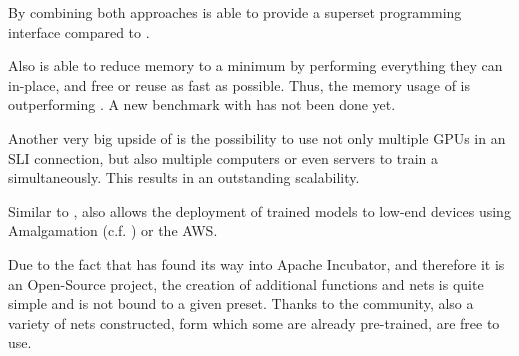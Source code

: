 By combining both approaches \mxnet is able to provide a superset programming interface compared to \caffe. \cite{chen2015mxnet}

Also \mxnet is able to reduce memory to a minimum by performing everything they can in-place, and free or reuse as fast as possible. Thus, the memory usage of \mxnet is outperforming \caffe. \cite{chen2015mxnet} %
A new benchmark with \caffetwo has not been done yet.

Another very big upside of \mxnet is the possibility to use not only multiple GPUs in an SLI connection, but also multiple computers or even servers to train a \nn simultaneously. This results in an outstanding scalability. \cite{chen2015mxnet}

Similar to \caffetwo, \mxnet also allows the deployment of trained models to low-end devices using Amalgamation (c.f. \cite{MxNetHomepage}) or the AWS.

Due to the fact that \mxnet has found its way into Apache Incubator, and therefore it is an Open-Source project, the creation of additional functions and nets is quite simple and is not bound to a given preset. Thanks to the community, also a variety of nets constructed, form which some are already pre-trained, are free to use. \cite{MxNetGithubModelGallery}
